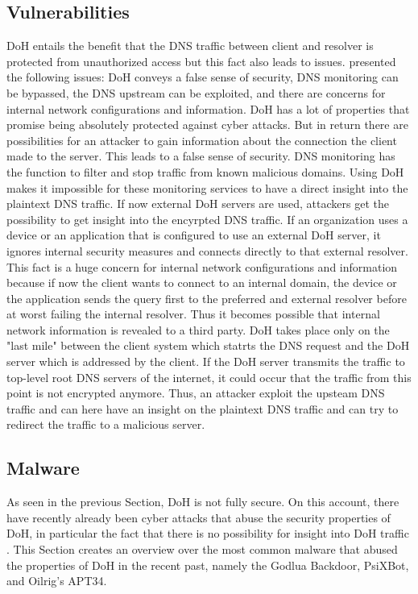 \subsection{Vulnerabilities} \label{doh_vulnerabilities}
DoH entails the benefit that the DNS traffic between client and resolver is protected from unauthorized access but this fact also leads to issues. \cite{NSA_AdoptingEncryptedDNS} presented the following issues:  DoH conveys a false sense of security, DNS monitoring can be bypassed, the DNS upstream can be exploited, and there are concerns for internal network configurations and information. DoH has a lot of properties that promise being absolutely protected against cyber attacks. But in return there are possibilities for an attacker to gain information about the connection the client made to the server. This leads to a false sense of security. DNS monitoring has the function to filter and stop traffic from known malicious domains. Using DoH makes it impossible for these monitoring services to have a direct insight into the plaintext DNS traffic. If now external DoH servers are used, attackers get the possibility to get insight into the encyrpted DNS traffic. If an organization uses a device or an application that is configured to use an external DoH server, it ignores internal security measures and connects directly to that external resolver. This fact is a huge concern for internal network configurations and information because if now the client wants to connect to an internal domain, the device or the application sends the query first to the preferred and external resolver before at worst failing the internal resolver. Thus it becomes possible that internal network information is revealed to a third party. DoH takes place only on the "last mile" between the client system which statrts the DNS request and the DoH server which is addressed by the client. If the DoH server transmits the traffic to top-level root DNS servers of the internet, it could occur that the traffic from this point is not encrypted anymore. Thus, an attacker exploit the upsteam DNS traffic and can here have an insight on the plaintext DNS traffic and can try to redirect the traffic to a malicious server.

\subsection{Malware} \label{malware}
As seen in the previous Section, DoH is not fully secure. On this account, there have recently already been cyber attacks that abuse the security properties of DoH, in particular the fact that there is no possibility for insight into DoH traffic \cite{bumanglag2020ImpactOfDNS}. This Section creates an overview over the most common malware that abused the properties of DoH in the recent past, namely the Godlua Backdoor, PsiXBot, and Oilrig's APT34.

